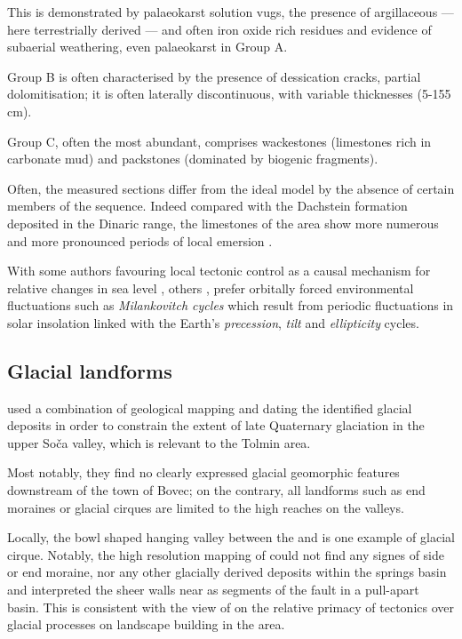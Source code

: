 This is demonstrated by palaeokarst solution vugs, the presence of argillaceous --- here terrestrially derived --- and often iron oxide rich residues and evidence of subaerial weathering, even palaeokarst in Group A.

Group B is often characterised by the presence of dessication cracks, partial dolomitisation; it is often laterally discontinuous, with variable thicknesses (5-155\,cm).

Group C, often the most abundant, comprises wackestones (limestones rich in carbonate mud) and packstones (dominated by biogenic fragments).

Often, the measured sections differ from the ideal model by the absence of certain members of the sequence. Indeed compared with the Dachstein formation deposited in the Dinaric range, the limestones of the  area show more numerous and more pronounced periods of local emersion \citep{ogorelec1996dachstein}.

 With some authors favouring local tectonic control as a causal mechanism  for relative changes in sea level \citep{goldhammer1990depositional,enos1998lofer}, others \citep{fisher1964lofer,balog1997shallow,haas2004characteristics,doi:10.1130/G21578.1}, prefer orbitally forced environmental fluctuations such as \emph{Milankovitch cycles} which result from periodic fluctuations in solar insolation linked with the Earth's \emph{precession}, \emph{tilt} and \emph{ellipticity} cycles. 



 \subsection{Glacial landforms}
 \citet{bavec2004late} used a combination of geological mapping and dating the identified glacial deposits in order to constrain the extent of late Quaternary glaciation in the upper So\v{c}a valley, which is relevant to the Tolmin area.

 Most notably, they find no clearly expressed glacial geomorphic features downstream of the town of Bovec; on the contrary, all landforms such as end moraines or glacial cirques are limited to the high reaches on the valleys. 

Locally, the bowl shaped hanging valley between the  and  is one example of glacial cirque. Notably, the high resolution mapping of \citet{cunningham2006application} could not find any signes of side or end moraine, nor any other glacially derived deposits within the  springs basin and interpreted the sheer walls near  as segments of the  fault in a pull-apart basin. 
This is consistent with the view of \citet{vsmuc2009tectonic} on the relative primacy of tectonics over glacial processes on landscape building in the  area.

